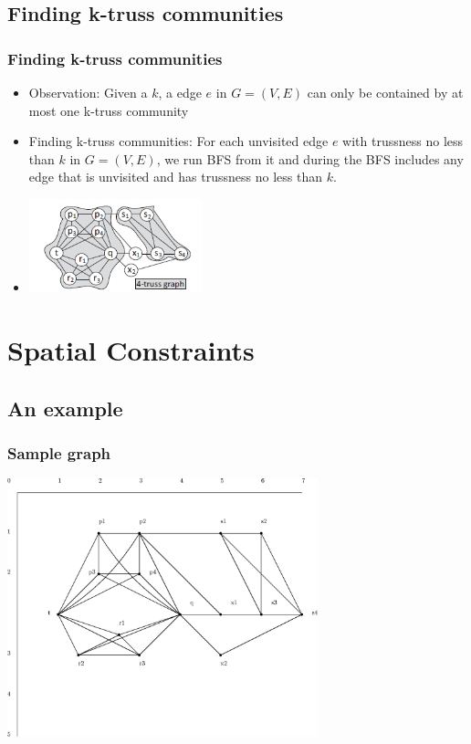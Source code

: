 \documentclass{beamer}
\begin{document}
\subsection{Finding k-truss communities}
\begin{frame}
\frametitle{Finding k-truss communities}
\begin{itemize}
\item Observation: Given a $k$, a edge $e$ in $G=(V,E)$ can only be contained by at most one k-truss community
\item Finding k-truss communities: For each unvisited edge $e$ with trussness no less than $k$ in $G=(V,E)$, we run BFS from it and during the BFS includes any edge that is unvisited and has trussness no less than $k$.
\item \includegraphics[width=5cm]{trusssample.jpg}
\end{itemize}
\end{frame}

\section{Spatial Constraints}

\subsection{An example}
\begin{frame}
\frametitle{Sample graph}	
	\includegraphics[width=9cm]{sg.eps}
\end{frame}
\end{document}
